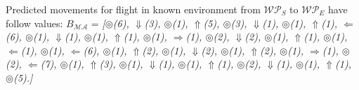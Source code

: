 Predicted movements for flight in known environment from $\mathscr{WP}_S$ to $\mathscr{WP}_E$ have follow values: $B_{\mathscr{MA}}$ = \textit{[$\circledcirc$(6), $\Downarrow$(3), $\circledcirc$(1), $\Uparrow$(5), $\circledcirc$(3), $\Downarrow$(1), $\circledcirc$(1), $\Uparrow$(1), $\Leftarrow$(6), $\circledcirc$(1), $\Downarrow$(1), $\circledcirc$(1), $\Uparrow$(1), $\circledcirc$(1), $\Rightarrow$(1), $\circledcirc$(2), $\Downarrow$(2), $\circledcirc$(1), $\Uparrow$(1), $\circledcirc$(1), $\Leftarrow$(1), $\circledcirc$(1), $\Leftarrow$(6), $\circledcirc$(1), $\Uparrow$(2), $\circledcirc$(1), $\Downarrow$(2), $\circledcirc$(1), $\Uparrow$(2), $\circledcirc$(1), $\Rightarrow$(1), $\circledcirc$(2), $\Leftarrow$(7), $\circledcirc$(1), $\Uparrow$(3), $\circledcirc$(1), $\Downarrow$(1), $\circledcirc$(1), $\Uparrow$(1), $\circledcirc$(2), $\Downarrow$(1), $\circledcirc$(1), $\Uparrow$(1), $\circledcirc$(5).]} 

